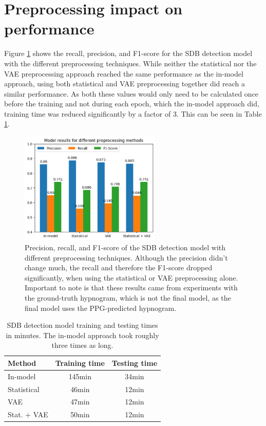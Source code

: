 \section{Preprocessing impact on performance}

Figure \ref{fig:preprocessingresults} shows the recall, precision, and F1-score for the SDB detection model with the different preprocessing techniques. While neither the statistical nor the VAE preprocessing approach reached the same performance as the in-model approach, using both statistical and VAE preprocessing together did reach a similar performance. As both these values would only need to be calculated once before the training and not during each epoch, which the in-model approach did, training time was reduced significantly by a factor of 3. This can be seen in Table \ref{tab:preprocessing-times}.

\begin{figure}
    \centering
    \includegraphics[width=0.6\textwidth]{images/PreprocessingResults}
    \caption{Precision, recall, and F1-score of the SDB detection model with different preprocessing techniques. Although the precision didn't change much, the recall and therefore the F1-score dropped significantly, when using the statistical or VAE preprocessing alone.
    Important to note is that these results came from experiments with the ground-truth hypnogram, which is not the final model, as the final model uses the PPG-predicted hypnogram.}
    \label{fig:preprocessingresults}
\end{figure}

\renewcommand{\arraystretch}{1.5}
\begin{table}
    \centering
    \begin{tabular}{ l c c }
        Method & Training time & Testing time \\
        \hline
        In-model & 145min & 34min \\
        Statistical & 46min & 12min \\
        VAE & 47min & 12min \\
        Stat. + VAE & 50min & 12min \\
    \end{tabular}
    \caption{SDB detection model training and testing times in minutes. The in-model approach took roughly three times as long. \label{tab:preprocessing-times}}
\end{table}

